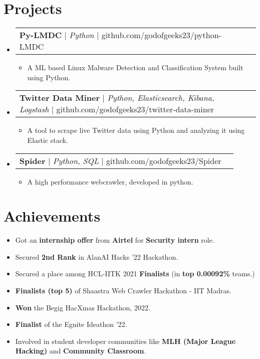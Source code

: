 \documentclass[a4paper,20pt]{article}
\makeatletter
\newcommand{\resumeItem}[1]{
  \item\small{
    {#1 \vspace{-2pt}}
  }
}
\newcommand{\resumeProjectHeading}[2]{
    \item
    \begin{tabular*}{1.001\textwidth}{l@{\extracolsep{\fill}}r}
      \small#1 & \textbf{\small }\\
    \end{tabular*}\vspace{-7pt}
    

}
\newcommand{\resumeSubHeadingListStart}{\begin{itemize}[leftmargin=0.0in, label={}]}
\newcommand{\resumeSubHeadingListEnd}{\end{itemize}}
\newcommand{\resumeItemListStart}{\begin{itemize}}
\newcommand{\resumeItemListEnd}{\end{itemize}\vspace{-5pt}}
\makeatother
\begin{document}
\section{Projects}
    \vspace{-5pt}
    \resumeSubHeadingListStart
    \resumeProjectHeading
          {\textbf{Py-LMDC} $|$ \emph{Python} $|$ {github.com/godofgeeks23/python-LMDC}}{temp}
          \resumeItemListStart
            \resumeItem{A ML based Linux Malware Detection and Classification
System built using Python.}
          \resumeItemListEnd
    \vspace{-13pt}
      \resumeProjectHeading
          {\textbf{Twitter Data Miner} $|$ \emph{Python, Elasticsearch, Kibana, Logstash}  $|$ {github.com/godofgeeks23/twitter-data-miner}}{temp}
          \resumeItemListStart
            \resumeItem{A tool to scrape live Twitter data using Python and analyzing it using Elastic stack.}
          \resumeItemListEnd
    \vspace{-13pt}
      \resumeProjectHeading
          {\textbf{Spider} $|$ \emph{Python, SQL}  $|$ {github.com/godofgeeks23/Spider}}{temp}
          \resumeItemListStart
            \resumeItem{A high performance webcrawler, developed in python.}
          \resumeItemListEnd
    \resumeSubHeadingListEnd
\vspace{-15pt}

%
\section{Achievements}
 \begin{itemize}[leftmargin=0.15in, label={}]
    \resumeItemListStart
        \resumeItem{Got an \textbf{internship offer} from \textbf{Airtel} for \textbf{Security intern} role.}
        \resumeItem{Secured \textbf{2nd Rank} in AlanAI Hacks '22 Hackathon.}
        \resumeItem{Secured a place among HCL-IITK 2021 \textbf{Finalists} (in \textbf{top 0.00092\%} teams.)}
        \resumeItem{\textbf{Finalists (top 5)} of Shaastra Web Crawler Hackathon - IIT Madras.}
        \resumeItem{\textbf{Won} the Begig HacXmas Hackathon, 2022.}
        \resumeItem{\textbf{Finalist} of the Egnite Ideathon '22.}
        \resumeItem{Involved in student developer communities like \textbf{MLH (Major League Hacking)} and \textbf{Community Classroom}.}
      \resumeItemListEnd
 \end{itemize}
 \vspace{-16pt}
 
\end{document}

